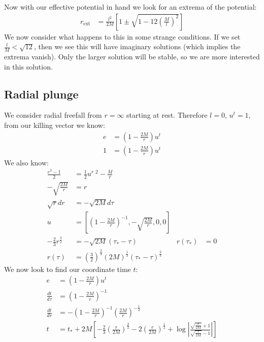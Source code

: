 Now with our effective potential in hand we look for an extrema of the potential:
\begin{align*}
	r_\text{ext} &= \frac{l^2}{2M}\left[1\pm\sqrt{1 - 12\left(\frac{M}{l}\right)^2}\right]
\end{align*}
We now consider what happens to this in some strange conditions. If we set $\frac{l}{M} < \sqrt{12}$, then we see this will have imaginary solutions (which implies the extrema vanish).
Only the larger solution will be stable, so we are more interested in this solution.

\subsection{Radial plunge}
We consider radial freefall from $r=\infty$ starting at rest. Therefore $l = 0$, $u^t = 1$, from our killing vector we know:
\begin{align*}
	e &= \left(1 - \frac{2M}{r}\right)u^t \\
	1 &= \left(1 - \frac{2M}{r}\right)u^t 
\end{align*}
We also know:
\begin{align*}
	\frac{e^2-1}{2} &= \frac{1}{2} u^r\ ^2 - \frac{M}{r} \\
	-\sqrt{\frac{2M}{r}} &= r \\
	\sqrt{r} dr &= -\sqrt{2M} d\tau \\
	u &= \left[ \left(1- \frac{2M}{r}\right)^{-1}, -\sqrt{\frac{2M}{r}}, 0, 0\right] \\
	- \frac{2}{3}r^\frac{3}{2} &= -\sqrt{2M}(\tau_* - \tau) & r(\tau_*) &= 0 \\
	r(\tau) &= \left(\frac{3}{2}\right)^\frac{2}{3} (2M)^\frac{1}{3}(\tau_* - \tau)^\frac{2}{3}
\end{align*}
We now look to find our coordinate time $t$:
\begin{align*}
	e &= \left(1 - \frac{2M}{r}\right)u^t \\
	\frac{dt}{d\tau} &= \left(1 - \frac{2M}{r}\right)^{-1} \\
	\frac{dt}{dr} &= -\left(1 - \frac{2M}{r}\right)^{-1}\left(\frac{2M}{r}\right)^{-\frac{1}{2}} \\
	t &= t_* + 2M\left[ -\frac{2}{3}\left(\frac{r}{2M}\right)^\frac{3}{2} - 2\left(\frac{r}{2M}\right)^\frac{1}{2} + \log|\frac{\sqrt{\frac{r}{2M}} + 1}{\sqrt{\frac{r}{2M}} - 1} |\right]
\end{align*}

